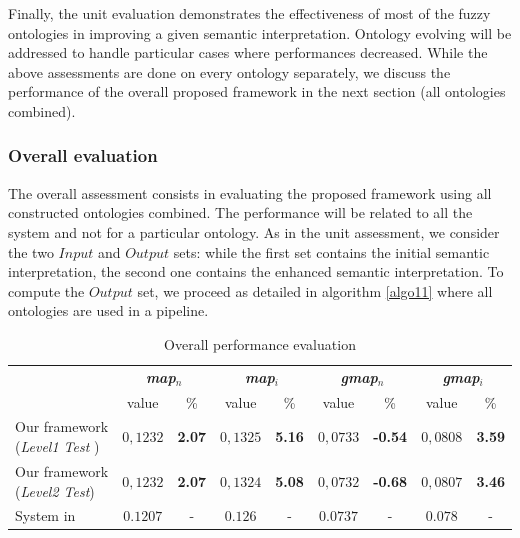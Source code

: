 		Finally, the unit evaluation demonstrates the effectiveness of most of the 
		fuzzy ontologies in improving a given semantic interpretation. Ontology evolving 
		will be addressed to handle particular cases where performances decreased. While the above 
		assessments are done on every ontology separately, we discuss the performance 
		of the overall  proposed framework in the next section (all ontologies combined).

		\subsubsection{Overall evaluation}
		The overall assessment consists in evaluating the proposed framework using all 
		constructed ontologies combined. The performance will be related to all the system and not 
		for a particular ontology.
		As in the unit assessment, we consider the two $Input$ and $Output$ sets: while the first set contains 
		the initial semantic interpretation, the second one contains the enhanced semantic 
		interpretation. To compute the $Output$ set, we proceed as detailed in algorithm \ref{algo11} where all 
		ontologies are used in a pipeline. 

		\begin{table}
	\centering	
	\caption{Overall performance evaluation}
		\label{final}
		\begin{tabular}{p{4cm}|cc|cc|cc|cc} 
			
			&\multicolumn{2}{c}{\textbf{\textit{map$_{n}$}}} & 
			\multicolumn{2}{c}{\textbf{\textit{map$_{i}$}}} &
			\multicolumn{2}{c}{\textbf{\textit{gmap$_{n}$}}} & 
			\multicolumn{2}{c}{\textbf{\textit{gmap$_{i}$}}}  \\
			& value & \% & value & \% & value  & \% & value & \% \\
			\hline  
		
			Our framework (\emph{Level1 Test} ) & 
						$0,1232$ & \textbf{2.07} & 
						$0,1325$ & \textbf{5.16} & 
						$0,0733$ & \textbf{-0.54} & 
						$0,0808$ & \textbf{3.59} \\
			Our framework (\emph{Level2 Test}) & 
						$0,1232$ & \textbf{2.07} & 
						$0,1324$ & \textbf{5.08} & 
						$0,0732$ & \textbf{-0.68} &
						$0,0807$ & \textbf{3.46} \\
			System in \cite{Ksibi2012}  & $0.1207$ & - & $0.126$ & - & $0.0737$ 
						& - & $0.078$ & - \\

			\hline 
\end{tabular}
\end{table}
		
